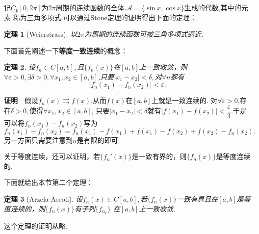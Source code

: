 \documentclass[UTF8]{article}
\newcommand{\zm}{\textbf{证明}$\quad$}
\newtheorem{thm}{\hspace{2em}定理}[section]
\begin{document}
  记$C_p[0,2\pi]$为$2\pi$周期的连续函数的全体.$\mathscr{A}=\{\sin x,\cos x\}$生成的代数,其中的元素
  称为三角多项式.可以通过Stone定理的证明得出下面的定理：
  \begin{thm}[Weierstrass]
    以$2\pi$为周期的连续函数可被三角多项式逼近.
  \end{thm}
  下面首先阐述一下\textbf{等度一致连续}的概念：
  \begin{thm}
    设$f_n\in C[a,b],$且$\{f_n(x)\}$在$[a,b]$上一致收敛，则$\forall\varepsilon>0,\exists \delta>0,
    \forall x_1,x_2\in[a,b]$,只要$|x_1-x_2|<\delta,$对$\forall n$都有
    $$|f_n(x_1)-f_n(x_2)|<\varepsilon.$$
  \end{thm}
  \zm 假设$f_n(x)\rightrightarrows f(x).$从而$f(x)$在$[a,b]$上就是一致连续的.
  对$\forall \varepsilon>0$,存在$\delta>0,$使得$\forall x_1,x_2\in[a,b]$,
  只要$|x_1-x_2|<\delta$就有$|f(x_1)-f(x_2)|<\dfrac{\varepsilon}{3}$.于是可以将$f_n(x_1)-f_n(x_2)$写为
  $$f_n(x_1)-f_n(x_2)=f_n(x_1)-f(x_1)+f(x_1)-f(x_2)+f(x_2)-f_n(x_2).$$
  另一方面只需要注意到$n$是有限的即可.

  关于等度连续，还可以证明，若$\{f_n'(x)\}$是一致有界的，则$\{f_n(x)\}$是等度连续的.

  下面就给出本节第二个定理：
  \begin{thm}[Arzela-Ascoli]
    设$f_n(x)\in C[a,b],$若$\{f_n(x)\}$一致有界且在$[a,b]$是等度连续的，则$\{f_n(x)\}$有子列$\{f_{n_k}\}$
    在$[a,b]$上一致收敛.
  \end{thm}
  这个定理的证明从略.
\clearpage
\end{document}
